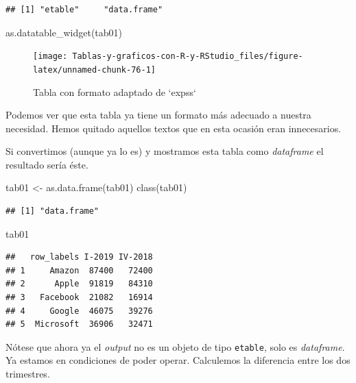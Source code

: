 \documentclass[
]{book}
\newenvironment{Shaded}{\begin{snugshade}}{\end{snugshade}}
\newcommand{\FunctionTok}[1]{\textcolor[rgb]{0.00,0.00,0.00}{#1}}
\newcommand{\NormalTok}[1]{#1}
\newcommand{\OtherTok}[1]{\textcolor[rgb]{0.56,0.35,0.01}{#1}}
\begin{document}
\begin{verbatim}
## [1] "etable"     "data.frame"
\end{verbatim}

\begin{Shaded}
\begin{Highlighting}[]
\FunctionTok{as.datatable\_widget}\NormalTok{(tab01)}
\end{Highlighting}
\end{Shaded}

\begin{figure}[H]

{\centering \texttt{[image: Tablas-y-graficos-con-R-y-RStudio\_files/figure-latex/unnamed-chunk-76-1]} 

}

\caption{Tabla con formato adaptado de `expss`}\label{fig:unnamed-chunk-76}
\end{figure}

Podemos ver que esta tabla ya tiene un formato más adecuado a nuestra necesidad. Hemos quitado aquellos textos que en esta ocasión eran innecesarios.

Si convertimos (aunque ya lo es) y mostramos esta tabla como \emph{dataframe} el resultado sería éste.

\begin{Shaded}
\begin{Highlighting}[]
\NormalTok{tab01 }\OtherTok{\textless{}{-}} \FunctionTok{as.data.frame}\NormalTok{(tab01)}
\FunctionTok{class}\NormalTok{(tab01)}
\end{Highlighting}
\end{Shaded}

\begin{verbatim}
## [1] "data.frame"
\end{verbatim}

\begin{Shaded}
\begin{Highlighting}[]
\NormalTok{tab01}
\end{Highlighting}
\end{Shaded}

\begin{verbatim}
##   row_labels I-2019 IV-2018
## 1     Amazon  87400   72400
## 2      Apple  91819   84310
## 3   Facebook  21082   16914
## 4     Google  46075   39276
## 5  Microsoft  36906   32471
\end{verbatim}

Nótese que ahora ya el \emph{output} no es un objeto de tipo \texttt{etable}, solo es \emph{dataframe}. Ya estamos en condiciones de poder operar. Calculemos la diferencia entre los dos trimestres.
\end{document}
